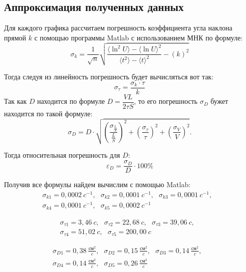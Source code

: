 \documentclass[a4paper,11.5pt]{article} %
\begin{document}
\subsection{Аппроксимация полученных данных}

Для каждого графика рассчитаем погрешность коэффициента угла наклона прямой $k$ с помощью программы  Matlab с использованием МНК по формуле:
\begin{equation}
	\sigma_k = \dfrac{1}{\sqrt{n}} \sqrt{\dfrac{\langle\ln^2 U\rangle - \langle\ln U\rangle^2}{\langle t^2\rangle - \langle t\rangle^2} - \left(k\right)^2}  
\end{equation}

Тогда следуя из линейность погрешность будет вычисляться вот так:
\begin{equation}
	\sigma_\tau = \dfrac{\sigma_k\cdot \tau}{k}
\end{equation}
Так как $D$ находится по формуле $D = \dfrac{VL}{2 \tau S}$, то его погрешность $\sigma_D$ бужет находится по такой формуле:
\begin{equation}
	\sigma_D = D \cdot \sqrt{\left(\dfrac{\sigma_{\frac{L}{S}}}{\frac{L}{S}}\right)^2 + \left(\dfrac{\sigma_{\tau}}{\tau}\right)^2 + \left(\dfrac{\sigma_V}{V}\right)^2}.
\end{equation}

Тогда относительная погрешность для $D$:
\begin{equation}
	\varepsilon_D = \frac{\sigma_D}{D}\cdot 100\%
\end{equation}

Получив все формулы найдем вычислим с помощью Matlab:
\begin{multline}
	\sigma_{k1} = 0,0002\ c^{-1},~~~\sigma_{k2} = 0,0001\  c^{-1},~~~\sigma_{k3} = 0,0001\ c^{-1},~~~\\
	\sigma_{k4} = 0,0001\ c^{-1},~~~\sigma_{k5} = 0,0002\ c^{-1}~~~
\end{multline}

\begin{multline}
	\sigma_{\tau 1} = 3,46\ c,~~~\sigma_{\tau 2} = 22,68\ c,~~~\sigma_{\tau 3} = 39,06\ c,~~~\\
	\sigma_{\tau 4} = 51,02\ c,~~~\sigma_{\tau 5} = 200,00\ c~~~
\end{multline}

\begin{multline}
	\sigma_{D1} = 0,38\ \frac{\text{см}^2}{c},~~~\sigma_{D2} = 0,15\ \frac{\text{см}^2}{c},~~~\sigma_{D3} = 0,14\ \frac{\text{см}^2}{c},~~~\\
	\sigma_{D4} = 0,14\ \frac{\text{см}^2}{c},~~~\sigma_{D5} = 0,26\ \frac{\text{см}^2}{c}~~~
\end{multline}
\end{document}
